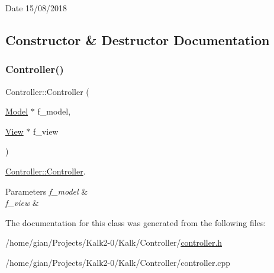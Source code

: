 \begin{DoxyDate}{Date}
15/08/2018 
\end{DoxyDate}


\subsection{Constructor \& Destructor Documentation}
\mbox{\label{class_controller_a7984f40669752a82c87e067bec6c3751}} 
\subsubsection{\texorpdfstring{Controller()}{Controller()}}
{\footnotesize\ttfamily Controller\+::\+Controller (\begin{DoxyParamCaption}\item[{\hyperlink{class_model}{Model} $\ast$}]{f\+\_\+model,  }\item[{\hyperlink{class_view}{View} $\ast$}]{f\+\_\+view }\end{DoxyParamCaption})}



\hyperlink{class_controller_a7984f40669752a82c87e067bec6c3751}{Controller\+::\+Controller}. 


\begin{DoxyParams}{Parameters}
{\em f\+\_\+model} & \\
\hline
{\em f\+\_\+view} & \\
\hline
\end{DoxyParams}


The documentation for this class was generated from the following files\+:\begin{DoxyCompactItemize}
\item 
/home/gian/\+Projects/\+Kalk2-\/0/\+Kalk/\+Controller/\hyperlink{controller_8h}{controller.\+h}\item 
/home/gian/\+Projects/\+Kalk2-\/0/\+Kalk/\+Controller/controller.\+cpp\end{DoxyCompactItemize}
